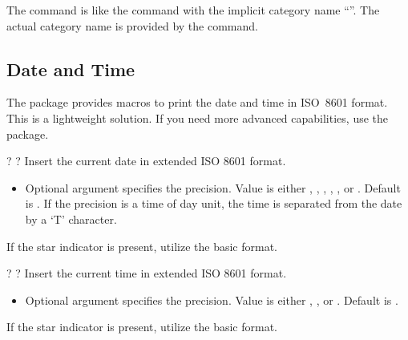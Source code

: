 \documentclass{scrartcl}
\begin{document}
{%
\begin{definition}
 
The  command is like the  command with the
implicit category name “”.  The actual category name is
provided by the  command.
\end{definition}


\subsection{Date and Time}

The  package provides macros to print the date and
time in ISO~8601 format.  This is a lightweight solution.  If you need
more advanced capabilities, use the
\href{https://mirrors.ctan.org/macros/latex/contrib/datetime2/datetime2.pdf}{}
package.

\begin{definition}
 \code{*}\kleene? \kleene?
Insert the current date in extended ISO 8601 format.
\begin{itemize}
\item Optional argument  specifies the precision.
Value is either , , , ,
, or .  Default is .  If the
precision is a time of day unit, the time is separated from the date
by a ‘T’ character.
\end{itemize}
If the star indicator is present, utilize the basic format.
\end{definition}

\begin{definition}
 \code{*}\kleene? \kleene?
Insert the current time in extended ISO 8601 format.
\begin{itemize}
\item Optional argument  specifies the precision.
Value is either , , or .  Default
is .
\end{itemize}
If the star indicator is present, utilize the basic format.
\end{definition}

}
\end{document}
